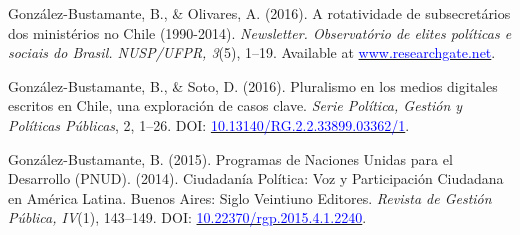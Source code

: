 \begin{publications}
\begin{benumerate}{8}

\item{González-Bustamante, B., \& Olivares, A. (2016). A rotatividade de subsecretários dos ministérios no Chile (1990-2014). {\itshape Newsletter. Observat\'orio de elites pol\'iticas e sociais do Brasil. NUSP/UFPR, 3}(5), 1--19. Available at \href{https://www.researchgate.net/publication/321993740_A_rotatividade_de_subsecretarios_dos_ministerios_no_Chile_1990-2014}{\textcolor{blue}{www.researchgate.net}}.}\vspace{1mm}


\item{González-Bustamante, B., \& Soto, D. (2016). Pluralismo en los medios digitales escritos en Chile, una exploración de casos clave. {\itshape Serie Política, Gestión y Políticas Públicas}, 2, 1--26. DOI: \href{http://doi.org/10.13140/RG.2.2.33899.03362/1}{\textcolor{blue}{10.13140/RG.2.2.33899.03362/1}}.}\vspace{1mm} %


\item{González-Bustamante, B. (2015). Programas de Naciones Unidas para el Desarrollo (PNUD). (2014). Ciudadanía Política: Voz y Participación Ciudadana en América Latina. Buenos Aires: Siglo Veintiuno Editores. {\itshape Revista de Gestión Pública, IV}(1), 143--149. DOI: \href{https://doi.org/10.22370/rgp.2015.4.1.2240}{\textcolor{blue}{10.22370/rgp.2015.4.1.2240}}.}

\end{benumerate}

\end{publications}

